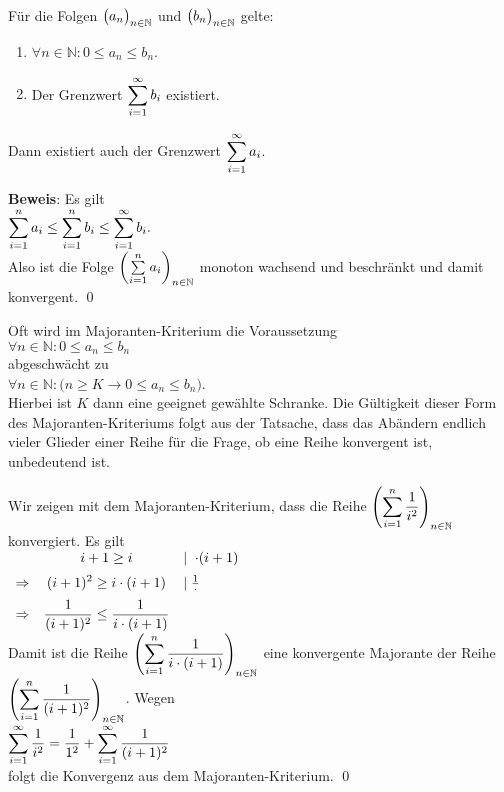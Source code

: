 \begin{Satz}
F\"ur die Folgen $\bigl(a_n\bigr)_{n\in\mathbb{N}}$  und  $\bigl(b_n\bigr)_{n\in\mathbb{N}}$  gelte:
\begin{enumerate}
\item $\forall n \in \mathbb{N}: 0 \leq a_n \leq b_n$.
\item Der Grenzwert $\displaystyle\sum\limits_{i=1}^\infty b_i$ existiert.
\end{enumerate}
Dann existiert auch der Grenzwert $\displaystyle\sum\limits_{i=1}^\infty a_i$.
\end{Satz}


\noindent
\textbf{Beweis}:  Es gilt
\\[0.2cm]
\hspace*{1.3cm}
$\displaystyle \sum\limits_{i=1}^n a_i \leq \sum\limits_{i=1}^n b_i \leq \sum\limits_{i=1}^\infty b_i. $
\\[0.2cm]
Also ist die Folge $\left(\sum\limits_{i=1}^{n} a_i\right)_{n\in\mathbb{N}}$ monoton wachsend und beschr\"ankt und
damit konvergent.
\qed

\remark
Oft wird im Majoranten-Kriterium die Voraussetzung
\\[0.2cm]
\hspace*{1.3cm}
$\forall n \in \mathbb{N}: 0 \leq a_n \leq b_n$ 
\\[0.2cm] 
abgeschw\"acht zu 
\\[0.2cm]
\hspace*{1.3cm}      
$\forall n \in \mathbb{N}: \bigl(n \geq K \rightarrow 0 \leq a_n \leq b_n\bigr)$.
\\[0.2cm]
Hierbei ist $K$ dann eine geeignet gew\"ahlte Schranke.  Die G\"ultigkeit dieser Form des
Majoranten-Kriteriums folgt aus der Tatsache, dass das Ab\"andern endlich vieler
Glieder einer Reihe f\"ur die Frage, ob eine Reihe konvergent ist, unbedeutend ist.

\example
Wir zeigen  mit dem Majoranten-Kriterium, dass die Reihe 
$\displaystyle\left(\sum\limits_{i=1}^{n} \frac{1}{i^2}\right)_{n\in\mathbb{N}}$ konvergiert.  Es gilt
\\[0.2cm]
\hspace*{1.3cm}
$
\begin{array}{lcl}
            & i + 1\geq i & \mid\; \cdot  (i+1) \\[0.2cm]
\Rightarrow & \displaystyle (i+1)^2 \geq i\cdot (i + 1) & \mid \frac{1}{\cdot} \\[0.2cm]
\Rightarrow & \displaystyle \frac{1}{(i+1)^2} \leq \frac{1}{i\cdot (i + 1)} 
\end{array}
$
\\[0.2cm]
Damit ist die Reihe $\displaystyle\left(\sum\limits_{i=1}^{n}\frac{1}{i\cdot (i+1)}\right)_{n\in\mathbb{N}}$
eine konvergente Majorante der Reihe $\displaystyle\left(\sum\limits_{i=1}^{n}\frac{1}{(i+1)^2}\right)_{n\in\mathbb{N}}$.  Wegen
\\[0.2cm]
\hspace*{1.3cm}
$\displaystyle \sum\limits_{i=1}^{\infty} \frac{1}{i^2} = \frac{1}{1^2} + \sum\limits_{i=1}^{\infty} \frac{1}{(i+1)^2} $
\\[0.2cm]
folgt die Konvergenz aus dem Majoranten-Kriterium. \qed


